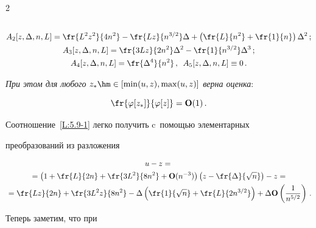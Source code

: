 \begin{multicols}{2}
\begin{gather*}
\\


 A_2[z,\Delta,n,L]=\fr{L^2 z^2}{4 n^2}- \fr{L z}{n^{3/2}} \Delta +\left(\fr{L}{n^2}  +\fr{1}{n}\right) \Delta ^2\,;


\\


 A_3[z,\Delta,n,L]=\fr{3 L z}{2 n^2}  \Delta^2-\fr{1}{n^{3/2}}\Delta^3\,;\\


 A_4[z,\Delta,n,L]= \fr{\Delta^4}{n^2}\,,\enskip


 A_5[z,\Delta,n,L]\equiv 0\,.


 \end{gather*}





 \textit{При этом для любого $z_*\hm\in \left[\min (u,z),\max (u,z)\right]$ верна оценка}:


 \begin{equation*}


\fr{ \varphi[z_*]}{\varphi[z]}=\Op(1)\,.




 \end{equation*}





 \Do


 Соотношение~\eqref{L:5.9-1} легко получить c~помощью элементарных


 преобразований из разложения


 \begin{multline*}


 u-z= {}\\


 {}= \left(1+\fr{L}{2 n}+\fr{3L^2}{8 n^2}+\Op(n^{-3})\right)


  \left(z-\fr{\Delta }{\sqrt{n}}\right)-z={}


\\


{} =\fr{L z}{2 n}+\fr{3 L^2 z}{8 n^2}


 -\Delta \left(\fr{1}{\sqrt{n}}+\fr{L}{2 n^{3/2}}\right)


 +\Delta \Op\left(\frac{1}{n^{5/2}}\right)\,.


 \end{multline*}





 Теперь заметим, что при 



\end{multicols}
